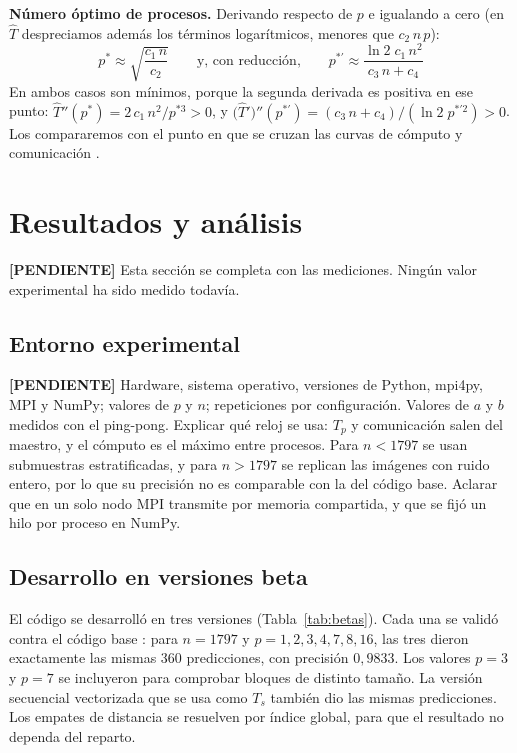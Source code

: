 \documentclass[11pt,a4paper]{article}
\newcommand{\pendiente}[1]{\textcolor{red!75!black}{\textbf{[PENDIENTE]} #1}}
\begin{document}
\textbf{Número óptimo de procesos.} Derivando respecto de $p$ e igualando a cero (en $\hat T$ despreciamos además los términos logarítmicos, menores que $c_2\,n\,p$):
\[
p^*\approx\sqrt{\frac{c_1\,n}{c_2}}
\qquad\text{y, con reducción,}\qquad
p^{*\prime}\approx\frac{\ln 2\;c_1\,n^2}{c_3\,n+c_4}
\]
En ambos casos son mínimos, porque la segunda derivada es positiva en ese punto: $\hat T''(p^*)=2\,c_1\,n^2/p^{*3}>0$, y $\big(\hat T'\big)''(p^{*\prime})=(c_3\,n+c_4)/(\ln 2\;p^{*\prime 2})>0$. Los compararemos con el punto en que se cruzan las curvas de cómputo y comunicación \cite{slides}.

\section{Resultados y análisis}

\pendiente{Esta sección se completa con las mediciones. Ningún valor experimental ha sido medido todavía.}

\subsection{Entorno experimental}
\label{sec:entorno}
\pendiente{Hardware, sistema operativo, versiones de Python, mpi4py, MPI y NumPy; valores de $p$ y $n$; repeticiones por configuración. Valores de $a$ y $b$ medidos con el ping-pong. Explicar qué reloj se usa: $T_p$ y comunicación salen del maestro, y el cómputo es el máximo entre procesos. Para $n<1797$ se usan submuestras estratificadas, y para $n>1797$ se replican las imágenes con ruido entero, por lo que su precisión no es comparable con la del código base. Aclarar que en un solo nodo MPI transmite por memoria compartida, y que se fijó un hilo por proceso en NumPy.}

\subsection{Desarrollo en versiones beta}
\label{sec:betas}
El código se desarrolló en tres versiones (Tabla~\ref{tab:betas}). Cada una se validó contra el código base \cite{base}: para $n=1797$ y $p=1,2,3,4,7,8,16$, las tres dieron exactamente las mismas 360 predicciones, con precisión $0{,}9833$. Los valores $p=3$ y $p=7$ se incluyeron para comprobar bloques de distinto tamaño. La versión secuencial vectorizada que se usa como $T_s$ también dio las mismas predicciones. Los empates de distancia se resuelven por índice global, para que el resultado no dependa del reparto.
\end{document}

